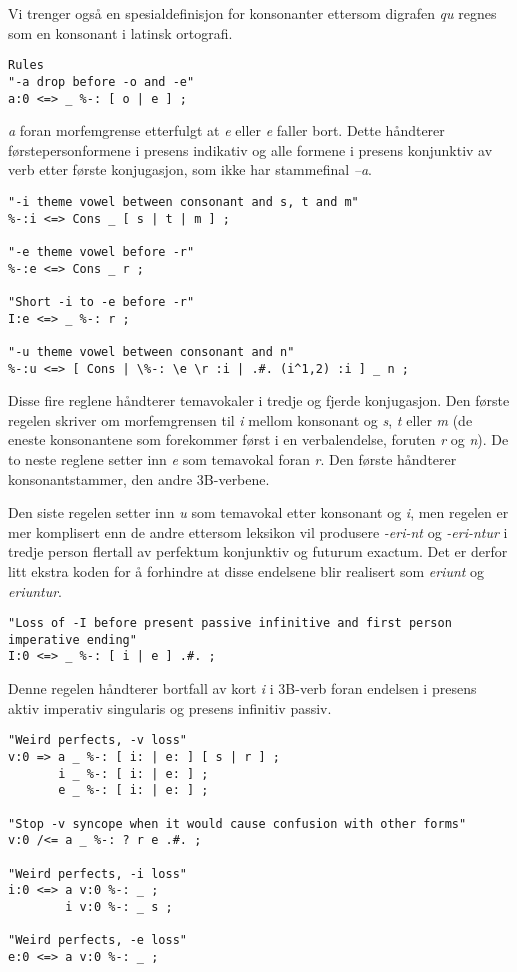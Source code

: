 \documentclass{article}
\let\w\emph
\begin{document}
Vi trenger ogs\aa{} en spesialdefinisjon for konsonanter ettersom digrafen
\w{qu} regnes som en konsonant i latinsk ortografi.

\begin{lstlisting}[name=verbs-twolc.txt]
Rules
"-a drop before -o and -e"
a:0 <=> _ %-: [ o | e ] ;
\end{lstlisting}

\w{a} foran morfemgrense etterfulgt at \w{e} eller \w{e} faller bort. Dette
h\aa{}ndterer f\o{}rstepersonformene i presens indikativ og alle formene i
presens konjunktiv av verb etter f\o{}rste konjugasjon, som ikke har
stammefinal \w{--a}.

\begin{lstlisting}[name=verbs-twolc.txt]
"-i theme vowel between consonant and s, t and m"
%-:i <=> Cons _ [ s | t | m ] ;

"-e theme vowel before -r"
%-:e <=> Cons _ r ;

"Short -i to -e before -r"
I:e <=> _ %-: r ;

"-u theme vowel between consonant and n"
%-:u <=> [ Cons | \%-: \e \r :i | .#. (i^1,2) :i ] _ n ;
\end{lstlisting}

Disse fire reglene h\aa{}ndterer temavokaler i tredje og fjerde konjugasjon.
Den f\o{}rste regelen skriver om morfemgrensen til \w{i} mellom konsonant og
\w{s}, \w{t} eller \w{m} (de eneste konsonantene som forekommer f\o{}rst i en
verbalendelse, foruten \w{r} og \w{n}). De to neste reglene setter inn \w{e} som
temavokal foran \w{r}. Den f\o{}rste h\aa{}ndterer konsonantstammer, den andre
3B-verbene.

Den siste regelen setter inn \w{u} som temavokal etter konsonant og \w{i}, men
regelen er mer komplisert enn de andre ettersom leksikon vil produsere
\w{-eri-nt} og \w{-eri-ntur} i tredje person flertall av perfektum konjunktiv
og futurum exactum. Det er derfor litt ekstra koden for \aa{} forhindre at
disse endelsene blir realisert som \w{eriunt} og \w{eriuntur}.

\begin{lstlisting}[name=verbs-twolc.txt]
"Loss of -I before present passive infinitive and first person imperative ending"
I:0 <=> _ %-: [ i | e ] .#. ;
\end{lstlisting}

Denne regelen h\aa{}ndterer bortfall av kort \w{i} i 3B-verb foran endelsen i
presens aktiv imperativ singularis og presens infinitiv passiv.

\begin{lstlisting}[name=verbs-twolc.txt]
"Weird perfects, -v loss"
v:0 => a _ %-: [ i: | e: ] [ s | r ] ;
       i _ %-: [ i: | e: ] ;
       e _ %-: [ i: | e: ] ;

"Stop -v syncope when it would cause confusion with other forms"
v:0 /<= a _ %-: ? r e .#. ;

"Weird perfects, -i loss"
i:0 <=> a v:0 %-: _ ;
        i v:0 %-: _ s ;

"Weird perfects, -e loss"
e:0 <=> a v:0 %-: _ ;
\end{lstlisting}
\end{document}
